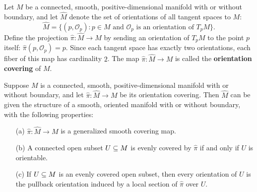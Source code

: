 Let $M$ be a connected, smooth, positive-dimensional manifold with or without boundary, and let $\widehat{M}$ denote the set of orientations of all tangent spaces to $M$:
\[\widehat{M}=\{(p,\mathcal{O}_p):\text{$p\in M$ and $\mathcal{O}_p$ is an orientation of $T_pM$}\}.\]
Define the projection $\widehat{\pi}:\widehat{M}\to M$ by sending an orientation of $T_pM$ to the point $p$ itself: $\widehat{\pi}(p,\mathcal{O}_p)=p$. Since each tangent space has exactly two orientations, each fiber of this map has cardinality $2$. The map $\widehat{\pi}:\widehat{M}\to M$ is called the \textbf{orientation covering} of $M$.
\begin{proposition}\label{orientation cover prop}
Suppose $M$ is a connected, smooth, positive-dimensional manifold with or without boundary, and let $\widehat{\pi}:\widehat{M}\to M$ be its orientation covering. Then $\widehat{M}$ can be given the structure of a smooth, oriented manifold with or without boundary, with the following properties:
\begin{itemize}
\item[(a)] $\widehat{\pi}:\widehat{M}\to M$ is a generalized smooth covering map.
\item[(b)] A connected open subset $U\subseteq M$ is evenly covered by $\widehat{\pi}$ if and only if $U$ is orientable.
\item[(c)] If $U\subseteq M$ is an evenly covered open subset, then every orientation of $U$ is the pullback orientation induced by a local section of $\widehat{\pi}$ over $U$.
\end{itemize}
\end{proposition}

